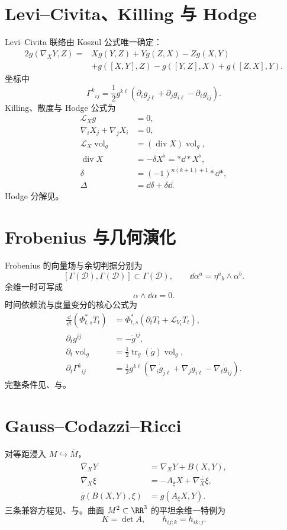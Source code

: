 \section{Levi--Civita、Killing 与 Hodge}
Levi--Civita 联络由 Koszul 公式唯一确定：
\[
\begin{aligned}
2g(\nabla_XY,Z)
={}&Xg(Y,Z)+Yg(Z,X)-Zg(X,Y)\\
&+g([X,Y],Z)-g([Y,Z],X)+g([Z,X],Y).
\end{aligned}
\]
坐标中
\[
\Gamma^k{}_{ij}
=\frac12g^{k\ell}
(\partial_i g_{j\ell}+\partial_j g_{i\ell}-\partial_\ell g_{ij}).
\]
Killing、散度与 Hodge 公式为
\begin{align*}
\mathcal L_Xg&=0,\\
\nabla_iX_j+\nabla_jX_i&=0,\\
\mathcal L_X\operatorname{vol}_g&=(\operatorname{div} X)\operatorname{vol}_g,\\
\operatorname{div} X&=-\delta X^\flat=*\dd*X^\flat,\\
\delta&=(-1)^{n(k+1)+1}*\dd*,\\
\Delta&=\dd\delta+\delta\dd.
\end{align*}
Hodge 分解见。

\section{Frobenius 与几何演化}
Frobenius 的向量场与余切判据分别为
\[
[\Gamma(\mathcal D),\Gamma(\mathcal D)]\subset\Gamma(\mathcal D),
\qquad
\dd\alpha^a=\eta^a{}_b\wedge\alpha^b.
\]
余维一时可写成
\[
\alpha\wedge\dd\alpha=0.
\]
时间依赖流与度量变分的核心公式为
\begin{align*}
\frac{\dd}{\dd t}(\Phi_{t,s}^*T_t)
&=\Phi_{t,s}^*(\partial_tT_t+\mathcal L_{V_t}T_t),\\
\partial_tg^{ij}&=-\dot g^{ij},\\
\partial_t\operatorname{vol}_g&=\frac12\operatorname{tr}_g(\dot g)\operatorname{vol}_g,\\
\partial_t\Gamma^k{}_{ij}
&=\frac12g^{k\ell}(\nabla_i \dot g_{j\ell}+\nabla_j \dot g_{i\ell}-\nabla_\ell \dot g_{ij}).
\end{align*}
完整条件见、与。

\section{Gauss--Codazzi--Ricci}
对等距浸入 \(M\hookrightarrow\overline M\)，
\begin{align*}
\overline\nabla_XY&=\nabla_XY+B(X,Y),\\
\overline\nabla_X\xi&=-A_\xi X+\nabla_X^\perp\xi,\\
\overline g(B(X,Y),\xi)&=g(A_\xi X,Y).
\end{align*}
三条兼容方程见、与。曲面 \(M^2\subset\RR^3\) 的平坦余维一特例为
\[
K=\det A,
\qquad
h_{ij;k}=h_{ik;j}.
\]
